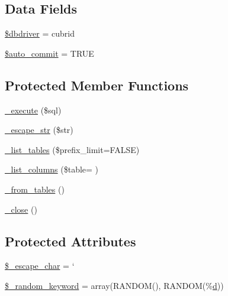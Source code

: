 \subsection*{Data Fields}
\begin{DoxyCompactItemize}
\item 
\hyperlink{class_c_i___d_b__cubrid__driver_a0cde2a16322a023d040aa7f725877597}{\$dbdriver} = \textquotesingle{}cubrid\textquotesingle{}
\item 
\hyperlink{class_c_i___d_b__cubrid__driver_a2620b91fdfd73aa770c443ad172f1914}{\$auto\+\_\+commit} = T\+R\+U\+E
\end{DoxyCompactItemize}
\subsection*{Protected Member Functions}
\begin{DoxyCompactItemize}
\item 
\hyperlink{class_c_i___d_b__cubrid__driver_a114ab675d89bf8324a41785fb475e86d}{\+\_\+execute} (\$sql)
\item 
\hyperlink{class_c_i___d_b__cubrid__driver_af8ef0237bfcdb19215b63fff769e7a55}{\+\_\+escape\+\_\+str} (\$str)
\item 
\hyperlink{class_c_i___d_b__cubrid__driver_a435c0f3ce54fe7daa178baa8532ebd54}{\+\_\+list\+\_\+tables} (\$prefix\+\_\+limit=F\+A\+L\+S\+E)
\item 
\hyperlink{class_c_i___d_b__cubrid__driver_a2a81bb476a5c76fe6f763b0557c1e4c2}{\+\_\+list\+\_\+columns} (\$table= \textquotesingle{}\textquotesingle{})
\item 
\hyperlink{class_c_i___d_b__cubrid__driver_aef43f7e3e7b71d337ff3724c5eb14f10}{\+\_\+from\+\_\+tables} ()
\item 
\hyperlink{class_c_i___d_b__cubrid__driver_a4d9082658000e5ede8312067c6dda9db}{\+\_\+close} ()
\end{DoxyCompactItemize}
\subsection*{Protected Attributes}
\begin{DoxyCompactItemize}
\item 
\hyperlink{class_c_i___d_b__cubrid__driver_aaec2fb0112850159063a8e47ad3aed6e}{\$\+\_\+escape\+\_\+char} = \textquotesingle{}`\textquotesingle{}
\item 
\hyperlink{class_c_i___d_b__cubrid__driver_a10213aa6e05f6d924d3277bb1d2fea00}{\$\+\_\+random\+\_\+keyword} = array(\textquotesingle{}R\+A\+N\+D\+O\+M()\textquotesingle{}, \textquotesingle{}R\+A\+N\+D\+O\+M(\%\hyperlink{jquery_8canvasjs_8min_8js_a36541169dfff685f807208881a4f0021}{d})\textquotesingle{})
\end{DoxyCompactItemize}


